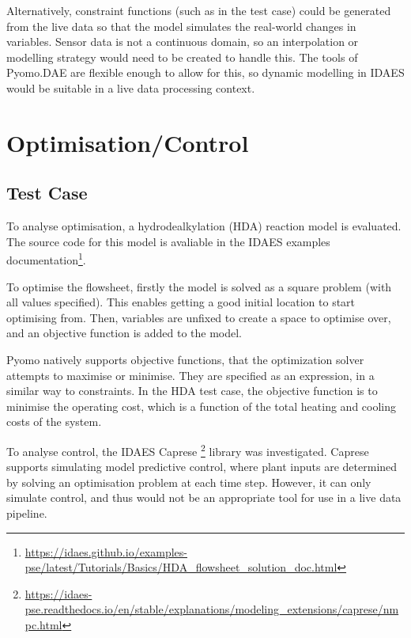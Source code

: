 \documentclass[12pt]{article}
\begin{document}
Alternatively, constraint functions (such as in the test case) could be generated from the live data so that the model simulates the real-world changes in variables. Sensor data is not a continuous domain, so an interpolation or modelling strategy would need to be created to handle this. The tools of Pyomo.DAE are flexible enough to allow for this, so dynamic modelling in IDAES would be suitable in a live data processing context.

\section{Optimisation/Control}

\subsection{Test Case}

To analyse optimisation, a hydrodealkylation (HDA) reaction model is evaluated. The source code for this model is avaliable in the IDAES examples documentation\footnote{\href{https://idaes.github.io/examples-pse/latest/Tutorials/Basics/HDA_flowsheet_solution_doc.html}{https://idaes.github.io/examples-pse/latest/Tutorials/Basics/HDA\_flowsheet\_solution\_doc.html}}.

To optimise the flowsheet, firstly the model is solved as a square problem (with all values specified). This enables getting a good initial location to start optimising from.
Then, variables are unfixed to create a space to optimise over, and an objective function is added to the model.

Pyomo natively supports objective functions, that the optimization solver attempts to maximise or minimise. They are specified as an expression, in a similar way to constraints. In the HDA test case, the objective function is to minimise the operating cost, which is a function of the total heating and cooling costs of the system. 

To analyse control, the IDAES Caprese \footnote{\href{https://idaes-pse.readthedocs.io/en/stable/explanations/modeling_extensions/caprese/nmpc.html}{https://idaes-pse.readthedocs.io/en/stable/explanations/modeling\_extensions/caprese/nmpc.html}} library was investigated. Caprese supports simulating model predictive control, where plant inputs are determined by solving an optimisation problem at each time step. However, it can only simulate control, and thus would not be an appropriate tool for use in a live data pipeline.
\end{document}
